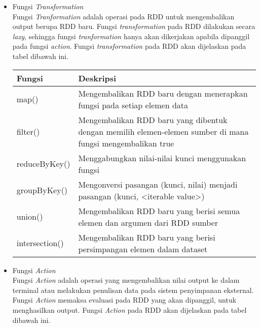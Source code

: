 \begin{itemize}
\item Fungsi \textit{Transformation}\\
Fungsi \textit{Tranformation} adalah operasi pada RDD untuk mengembalikan output berupa RDD baru. Fungsi \textit{transformation} pada RDD dilakukan secara \textit{lazy}, sehingga fungsi \textit{tranformation} hanya akan dikerjakan apabila dipanggil pada fungsi \textit{action}. Fungsi \textit{transformation} pada RDD akan dijelaskan pada tabel dibawah ini.\\

\begin{tabular}{|l|p{10cm}|}
\hline 
\rule[-1ex]{0pt}{2.5ex} Fungsi & Deskripsi \\ 
\hline 
\rule[-1ex]{0pt}{2.5ex} map() & Mengembalikan RDD baru dengan menerapkan fungsi pada setiap elemen data \\ 
\hline 
\rule[-1ex]{0pt}{2.5ex} filter() & Mengembalikan RDD baru yang dibentuk dengan memilih elemen-elemen sumber di mana fungsi mengembalikan true \\ 
\hline 
\rule[-1ex]{0pt}{2.5ex} reduceByKey() & Menggabungkan nilai-nilai kunci menggunakan fungsi \\ 
\hline 
\rule[-1ex]{0pt}{2.5ex} groupByKey() & Mengonversi pasangan (kunci, nilai) menjadi pasangan (kunci, <iterable value>) \\ 
\hline 
\rule[-1ex]{0pt}{2.5ex} union() & Mengembalikan RDD baru yang berisi semua elemen dan argumen dari RDD sumber \\ 
\hline 
\rule[-1ex]{0pt}{2.5ex} intersection() & Mengembalikan RDD baru yang berisi persimpangan elemen dalam dataset \\ 
\hline 
\end{tabular} 

\item Fungsi \textit{Action}\\
Fungsi \textit{Action} adalah operasi yang mengembalikan nilai output ke dalam terminal atau melakukan penulisan data pada sistem penyimpanan eksternal. Fungsi \textit{Action} memaksa evaluasi pada RDD yang akan dipanggil, untuk menghasilkan output. Fungsi \textit{Action} pada RDD akan dijelaskan pada tabel dibawah ini.\\


\end{itemize}
